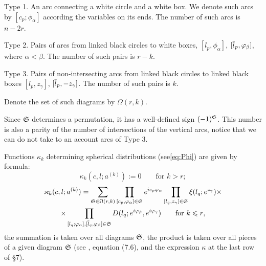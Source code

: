 \documentclass{article}
\newcounter{sec}
\def\sm{\smallskip}
\begin{document}
\sm

Type 1. An arc connecting  a white circle 
and  a white box. 
We denote such arcs by $[c_p;\phi_\alpha]$ according the variables on its ends.
The number of such arcs is $n-2r$.

\sm

Type 2. Pairs of arcs from  linked black circles  to white boxes,
$[l_p,\phi_\alpha]$, $[\overline l_p, \varphi_\beta]$, where $\alpha<\beta$.
The number of such pairs is $r-k$.


\sm

Type 3. Pairs of non-intersecting arcs from linked black circles to linked black boxes
$[l_p,z_\gamma]$, $[\overline l_p,-z_\gamma]$. The number of such pairs is
$k$.

\sm

Denote the set of such diagrams by $\Omega(r,k)$.

Since $\mathfrak S$ determines a permutation, it has a well-defined sign $(-1)^\mathfrak S$.
This number is also a parity of the number of intersections of 
the vertical arcs, notice that we can do not take to an account arcs of Type 3.

\sm




\sm

Functions $\kappa_k$ determining spherical distributions (see\ref{eq:Phi}) are given by formula: 
\begin{equation}
\kappa_k(c,l;a^{(k)}):=0 \qquad \text{for $k>r$};
\label{eq:kappa-1}
\end{equation}
\begin{multline}
\varkappa_k(c,l;a^{(k)})=\sum_{\mathfrak S\in\Omega(r,k)}
\prod_{[c_p,\varphi_\alpha]\in \mathfrak S} e^{i c_p\varphi_\alpha}
\prod_{[l_q,z_\gamma]\in \mathfrak S}
\xi(l_q; e^{z_\gamma})
\times\\\times
\prod_{[l_q;\varphi_\alpha],[\overline l_q, \varphi_\beta]\in\mathfrak S}
D(l_q;e^{i\varphi_\beta}, e^{i\varphi_\gamma})
\qquad\text{for $k\leqslant r$},
\label{eq:kappa-2}
\end{multline}
the summation is taken over all diagrams $\mathfrak S$, the product is taken over
all pieces of a given diagram $\mathfrak S$
(see \cite{San}, equation (7.6), and the expression $\kappa$ at the last row of
\S7).
\end{document}
